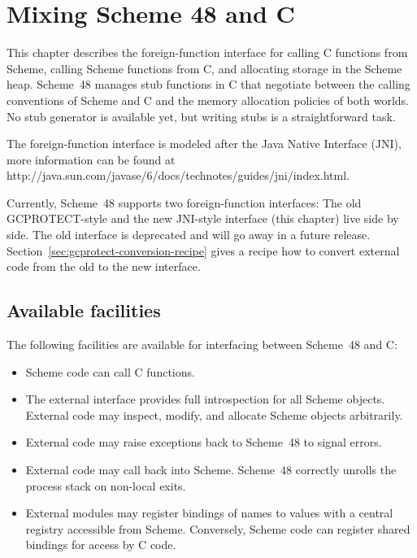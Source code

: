 

\chapter{Mixing Scheme 48 and C}
\label{external-chapter}

This chapter describes the foreign-function interface for calling C
functions from Scheme, calling Scheme functions from C, and allocating
storage in the Scheme heap.  Scheme~48 manages stub functions in C
that negotiate between the calling conventions of Scheme and C and the
memory allocation policies of both worlds.  No stub generator is
available yet, but writing stubs is a straightforward task.

The foreign-function interface is modeled after the Java Native
Interface (JNI), more information can be found at
{http://java.sun.com/javase/6/docs\-/technotes/guides/jni/index.html}.

Currently, Scheme~48 supports two foreign-function interfaces: The old
GCPROTECT-style and the new JNI-style interface (this chapter) live
side by side.  The old interface is deprecated and will go away in a
future release.  Section~\ref{sec:gcprotect-conversion-recipe} gives a
recipe how to convert external code from the old to the new interface.

\section{Available facilities}
\label{sec:facilities}

The following facilities are available for interfacing between
 Scheme~48 and C:
%
\begin{itemize}
\item Scheme code can call C functions.
\item The external interface provides full introspection for all
  Scheme objects.  External code may inspect, modify, and allocate
  Scheme objects arbitrarily.
\item External code may raise exceptions back to Scheme~48 to
  signal errors.
\item External code may call back into Scheme.  Scheme~48
  correctly unrolls the process stack on non-local exits.
\item External modules may register bindings of names to values with a 
  central registry accessible from
  Scheme.  Conversely, Scheme code can register shared
  bindings for access by C code.
\end{itemize}



